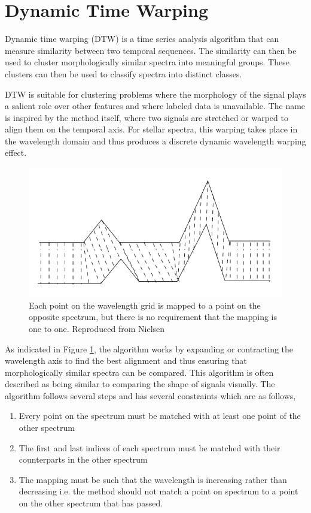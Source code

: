\section{Dynamic Time Warping}

Dynamic time warping (DTW) is a time series analysis algorithm that can measure similarity between two temporal sequences. The similarity can then be used to cluster morphologically similar spectra into meaningful groups. These clusters can then be used to classify spectra into distinct classes. 

DTW is suitable for clustering problems where the morphology of the signal plays a salient role over other features \citep{nielsen2019practical} and where labeled data is unavailable. The name is inspired by the method itself, where two signals are stretched or warped to align them on the temporal axis. For stellar spectra, this warping takes place in the wavelength domain and thus produces a discrete dynamic wavelength warping effect.

\begin{figure}[!htb]
\centering
\includegraphics[scale=1]{figures/Dynamic_time_warping.png}
\caption{Each point on the wavelength grid is mapped to a point on the opposite spectrum, but there is no requirement that the mapping is one to one. Reproduced from Nielsen \citep{nielsen2019practical}}
\label{fig4.1}
\end{figure}

As indicated in Figure \ref{fig4.1}, the algorithm works by expanding or contracting the wavelength axis to find the best alignment and thus ensuring that morphologically similar spectra can be compared. This algorithm is often described as being similar to comparing the shape of signals visually. The algorithm follows several steps and has several constraints which are as follows,

\begin{enumerate}
    \item Every point on the spectrum must be matched with at least one point of the other spectrum
    \item The first and last indices of each spectrum must be matched with their counterparts in the other spectrum
    \item The mapping must be such that the wavelength is increasing rather than decreasing i.e. the method should not match a point on spectrum to a point on the other spectrum that has passed. 
\end{enumerate}

